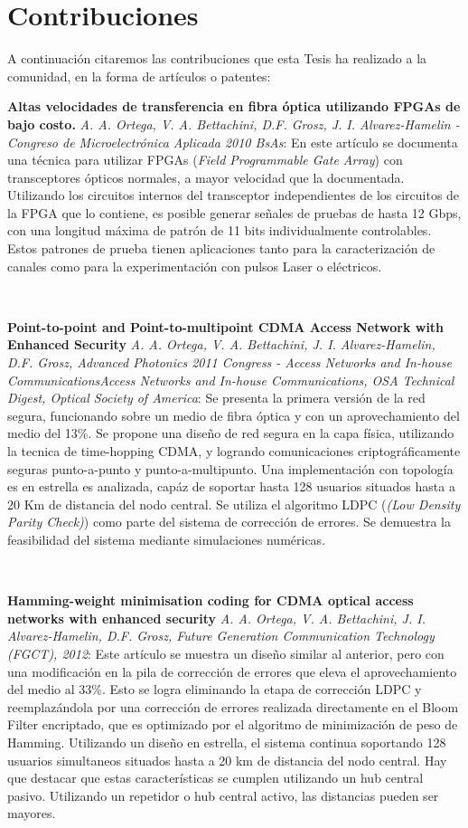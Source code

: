 \section{Contribuciones}

A continuación citaremos las contribuciones que esta Tesis ha realizado a la comunidad, en la forma de artículos o patentes:

\textbf{Altas velocidades de transferencia en fibra óptica utilizando FPGAs de bajo costo. } \textit{A. A. Ortega, V. A. Bettachini, D.F. Grosz, J. I. Alvarez-Hamelin - Congreso de Microelectrónica Aplicada 2010 BsAs}: En este artículo se documenta una técnica para utilizar FPGAs (\textit{Field Programmable Gate Array}) con transceptores ópticos normales, a mayor velocidad que la documentada. Utilizando los circuitos internos del transceptor independientes de los circuitos de la FPGA que lo contiene, es posible generar señales de pruebas de hasta 12 Gbps, con una longitud máxima de patrón de 11 bits individualmente controlables. Estos patrones de prueba tienen aplicaciones tanto para la caracterización de canales como para la experimentación con pulsos Laser o eléctricos.

\

\textbf{ Point-to-point and Point-to-multipoint CDMA Access Network with Enhanced Security} \textit{ A. A. Ortega, V. A. Bettachini, J. I. Alvarez-Hamelin,  D.F. Grosz, Advanced Photonics 2011 Congress - Access Networks and In-house CommunicationsAccess Networks and In-house Communications, OSA Technical Digest, Optical Society of America}: Se presenta la primera versión de la red segura, funcionando sobre un medio de fibra óptica y con un aprovechamiento del medio del 13\%. Se propone una diseño de red segura en la capa física, utilizando la tecnica de time-hopping CDMA, y logrando comunicaciones criptográficamente seguras punto-a-punto y punto-a-multipunto. Una implementación con topología es en estrella es analizada, capáz de soportar hasta 128 usuarios situados hasta a 20 Km de distancia del nodo central. Se utiliza el algoritmo LDPC (\textit{(Low Density Parity Check)}) como parte del sistema de corrección de errores. Se demuestra la feasibilidad del sistema mediante simulaciones numéricas.

\

\textbf{Hamming-weight minimisation coding for CDMA optical access networks with enhanced security} \textit{ A. A. Ortega, V. A. Bettachini, J. I. Alvarez-Hamelin, D.F. Grosz, Future Generation Communication Technology (FGCT), 2012}: Este artículo se muestra un diseño similar al anterior, pero con una modificación en la pila de corrección de errores que eleva el aprovechamiento del medio al 33\%. Esto se logra eliminando la etapa de corrección LDPC y reemplazándola por una corrección de errores realizada directamente en el Bloom Filter encriptado, que es optimizado por el algoritmo de minimización de peso de Hamming. Utilizando un diseño en estrella, el sistema continua soportando 128 usuarios simultaneos situados hasta a 20 km de distancia del nodo central. Hay que destacar que estas características se cumplen utilizando un hub central pasivo. Utilizando un repetidor o hub central activo, las distancias pueden ser mayores.


